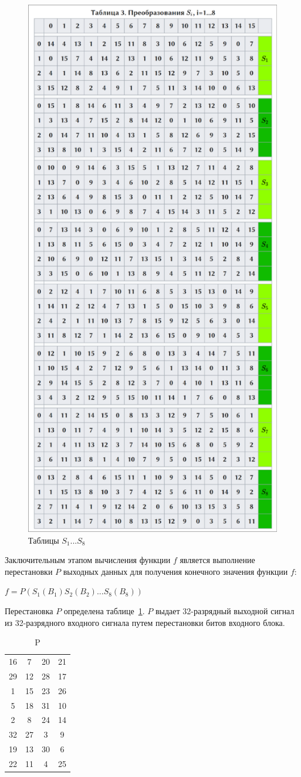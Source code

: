 \begin{figure}[ht!]
	\centering
	\includegraphics[width=0.65\linewidth]{assets/images/des-tables.png}
	\caption{Таблицы $S_1 ... S_8$}
	\label{fig:des-tables}
\end{figure}
\clearpage

Заключительным этапом вычисления функции $f$ является выполнение перестановки $P$ выходных данных для получения конечного значения функции $f$:

$f = P(S_1(B_1)S_2(B_2) ... S_8(B_8))$

Перестановка $P$ определена таблице~\ref{tbl:p}.
$P$ выдает 32-разрядный выходной сигнал из 32-разрядного входного сигнала путем перестановки битов входного блока.

\begin{table}[ht!]
    \begin{center}
	\captionsetup{justification=raggedright,singlelinecheck=off}
	\caption{\label{tbl:p} P}
        \begin{tabular}{ |c c c c|}
            16 & 7 & 20 & 21 \\
29 & 12 & 28 & 17 \\
1 & 15 & 23 & 26 \\
5 & 18 & 31 & 10 \\
2 & 8 & 24 & 14 \\
32 & 27 & 3 & 9 \\
19 & 13 & 30 & 6 \\
22 & 11 & 4 & 25
        \end{tabular}
    \end{center}
\end{table}

